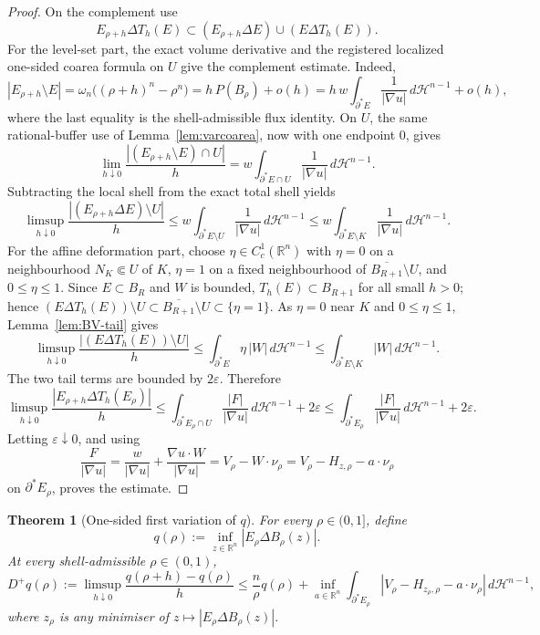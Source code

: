 \documentclass[11pt]{amsart}
\newtheorem{theorem}{Theorem}[section]
\theoremstyle{definition}
\newcommand{\R}{\mathbb R}
\newcommand{\eps}{\varepsilon}
\newcommand{\Hn}{\mathcal H^{n-1}}
\newcommand{\Per}{P}
\begin{document}
\begin{proof}
On the complement use
\[
   E_{\rho+h}\Delta T_h(E)\subset (E_{\rho+h}\Delta E)\cup(E\Delta T_h(E)).
\]
For the level-set part, the exact volume derivative and the registered
localized one-sided coarea formula on \(U\) give the complement estimate.
Indeed,
\[
   |E_{\rho+h}\setminus E|
   =\omega_n\bigl((\rho+h)^n-\rho^n\bigr)
   =h\,\Per(B_\rho)+o(h)
   =
   h\,w\int_{\partial^*E}\frac1{|\nabla u|}\,d\Hn+o(h),
\]
where the last equality is the shell-admissible flux identity.  On \(U\),
the same rational-buffer use of Lemma~\ref{lem:varcoarea}, now with one
endpoint \(0\), gives
\[
   \lim_{h\downarrow0}
   \frac{|(E_{\rho+h}\setminus E)\cap U|}{h}
   =
   w\int_{\partial^*E\cap U}\frac1{|\nabla u|}\,d\Hn .
\]
Subtracting the local shell from the exact total shell yields
\[
   \limsup_{h\downarrow0}
   \frac{|(E_{\rho+h}\Delta E)\setminus U|}{h}
   \le
   w\int_{\partial^*E\setminus U}\frac1{|\nabla u|}\,d\Hn
   \le
   w\int_{\partial^*E\setminus K}\frac1{|\nabla u|}\,d\Hn .
\]
For the affine deformation part, choose \(\eta\in C_c^1(\R^n)\) with
\(\eta=0\) on a neighbourhood \(N_K\Subset U\) of \(K\), \(\eta=1\) on a fixed
neighbourhood of \(\overline{B_{R+1}}\setminus U\), and \(0\le\eta\le1\).
Since \(E\subset B_R\) and \(W\) is bounded, \(T_h(E)\subset B_{R+1}\) for all
small \(h>0\); hence \((E\Delta T_h(E))\setminus U\subset
\overline{B_{R+1}}\setminus U\subset\{\eta=1\}\).  As \(\eta=0\) near \(K\) and
\(0\le\eta\le1\), Lemma~\ref{lem:BV-tail} gives
\[
   \limsup_{h\downarrow0}
   \frac{|(E\Delta T_h(E))\setminus U|}{h}
   \le
   \int_{\partial^*E}\eta\,|W|\,d\Hn
   \le
   \int_{\partial^*E\setminus K}|W|\,d\Hn .
\]
The two tail terms are bounded by \(2\eps\).  Therefore
\[
   \limsup_{h\downarrow0}\frac{|E_{\rho+h}\Delta T_h(E_\rho)|}{h}
   \le
   \int_{\partial^*E_\rho\cap U}\frac{|F|}{|\nabla u|}\,d\Hn+2\eps
   \le
   \int_{\partial^*E_\rho}\frac{|F|}{|\nabla u|}\,d\Hn+2\eps .
\]
Letting \(\eps\downarrow0\), and using
\[
   \frac{F}{|\nabla u|}
   =
   \frac{w}{|\nabla u|}
   +\frac{\nabla u\cdot W}{|\nabla u|}
   =
   V_\rho-W\cdot\nu_\rho
   =
   V_\rho-H_{z,\rho}-a\cdot\nu_\rho
\]
on \(\partial^*E_\rho\), proves the estimate.
\end{proof}

\begin{theorem}[One-sided first variation of \(q\)]\label{thm:qplus}
For every \(\rho\in(0,1]\), define
\[
   q(\rho):=\inf_{z\in\R^n}|E_\rho\Delta B_\rho(z)|.
\]
At every shell-admissible \(\rho\in(0,1)\),
\begin{equation}\label{eq:qplus}
   D^+q(\rho):=
   \limsup_{h\downarrow0}\frac{q(\rho+h)-q(\rho)}{h}
   \le
   \frac{n}{\rho}q(\rho)
   +
   \inf_{a\in\R^n}\int_{\partial^*E_\rho}
      |V_\rho-H_{z_\rho,\rho}-a\cdot\nu_\rho|\,d\Hn ,
\end{equation}
where \(z_\rho\) is any minimiser of
\(z\mapsto |E_\rho\Delta B_\rho(z)|\).
\end{theorem}
\end{document}
